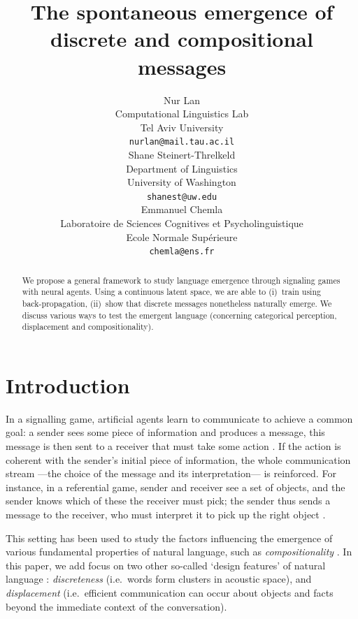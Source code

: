 \documentclass[11pt,a4paper]{article}
\title{The spontaneous emergence of discrete and compositional messages
	\\ \nbSST{(1) Thoughts on the title? (2) It's hidden on submission, but we need to decide author order as well.}
}
\author{Nur Lan \\
  Computational Linguistics Lab \\
  Tel Aviv University \\
  \texttt{nurlan@mail.tau.ac.il} \\\And
  Shane Steinert-Threlkeld \\
  Department of Linguistics \\
  University of Washington \\
  \texttt{shanest@uw.edu} \\\And
  Emmanuel Chemla \\
  Laboratoire de Sciences Cognitives et Psycholinguistique \\
  Ecole Normale Sup\'erieure \\
  \texttt{chemla@ens.fr}}
\date{}
\begin{document}
\maketitle

\begin{abstract}
	We propose a general framework to study language emergence through signaling games with neural agents. Using a continuous latent space, we are able to (i)~train using back-propagation, (ii)~show that discrete messages nonetheless naturally emerge. We discuss various ways to test the emergent language (concerning categorical perception, displacement and compositionality).
\end{abstract}

\section{Introduction}

In a signalling game, artificial agents learn to communicate to achieve a common goal: a sender sees some piece of information and produces a message, this message is then sent to a receiver that must take some action \citep{Lewis1969, Skyrms2010}. If the action is coherent with the sender's initial piece of information, the whole communication stream ---the choice of the message and its interpretation--- is reinforced. 
For instance, in a referential game, sender and receiver see a set of objects, and the sender knows which of these the receiver must pick; the sender thus sends a message to the receiver, who must interpret it to pick up the right object \citep{Lazaridou2017, Lazaridou2018, Havrylov2017, Chaabouni2019a}.

This setting has been used to study the factors influencing the emergence of various fundamental properties of natural language, such as \emph{compositionality} \citep{Kirby2015, Franke2016, SteinertThrelkeld2016, Mordatch2018, Lazaridou2018, Choi2018}.
In this paper, we add focus on two other so-called `design features' of natural language \citep{Hockett1960}: 
\emph{discreteness} (i.e.~words form clusters in acoustic space), 
and \emph{displacement} (i.e.~efficient communication can occur about objects and facts beyond the immediate context of the conversation).
\end{document}
